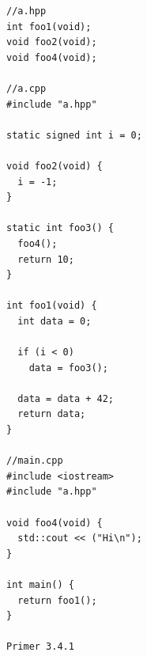 \documentclass[12pt,oneside]{memoir}
\begin{document}
\begin{lstlisting}[frame=single]
//a.hpp
int foo1(void);
void foo2(void);
void foo4(void);

//a.cpp
#include "a.hpp"

static signed int i = 0;

void foo2(void) {
  i = -1;
}

static int foo3() {
  foo4();
  return 10;
}

int foo1(void) {
  int data = 0;

  if (i < 0)
    data = foo3();

  data = data + 42;
  return data;
}

//main.cpp
#include <iostream>
#include "a.hpp"

void foo4(void) {
  std::cout << ("Hi\n");
}

int main() {
  return foo1();
}

Primer 3.4.1
\end{lstlisting}
\end{document}
